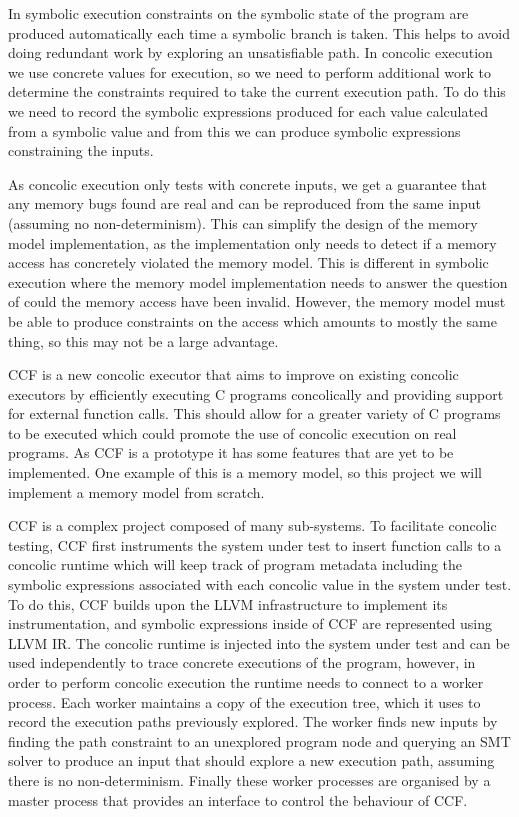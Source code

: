 \documentclass[12pt,twoside]{report}
\begin{document}
In symbolic execution constraints on the symbolic state of the program are produced automatically each time a symbolic branch is taken. This helps to avoid doing redundant work by exploring an unsatisfiable path. In concolic execution we use concrete values for execution, so we need to perform additional work to determine the constraints required to take the current execution path. To do this we need to record the symbolic expressions produced for each value calculated from a symbolic value and from this we can produce symbolic expressions constraining the inputs.

As concolic execution only tests with concrete inputs, we get a guarantee that any memory bugs found are real and can be reproduced from the same input (assuming no non-determinism). This can simplify the design of the memory model implementation, as the implementation only needs to detect if a memory access has concretely violated the memory model. This is different in symbolic execution where the memory model implementation needs to answer the question of could the memory access have been invalid. However, the memory model must be able to produce constraints on the access which amounts to mostly the same thing, so this may not be a large advantage.


CCF is a new concolic executor that aims to improve on existing concolic executors by efficiently executing C programs concolically and providing support for external function calls. This should allow for a greater variety of C programs to be executed which could promote the use of concolic execution on real programs. As CCF is a prototype it has some features that are yet to be implemented. One example of this is a memory model, so this project we will implement a memory model from scratch.

CCF is a complex project composed of many sub-systems. To facilitate concolic testing, CCF first instruments the system under test to insert function calls to a concolic runtime which will keep track of program metadata including the symbolic expressions associated with each concolic value in the system under test. To do this, CCF builds upon the LLVM infrastructure to implement its instrumentation, and symbolic expressions inside of CCF are represented using LLVM IR. The concolic runtime is injected into the system under test and can be used independently to trace concrete executions of the program, however, in order to perform concolic execution the runtime needs to connect to a worker process. Each worker maintains a copy of the execution tree, which it uses to record the execution paths previously explored. The worker finds new inputs by finding the path constraint to an unexplored program node and querying an SMT solver to produce an input that should explore a new execution path, assuming there is no non-determinism. Finally these worker processes are organised by a master process that provides an interface to control the behaviour of CCF.
\end{document}
